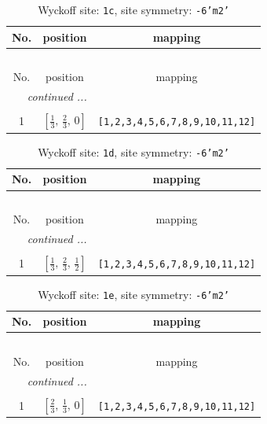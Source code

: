 \documentclass[fleqn,8pt]{jsarticle}
\begin{document}
\begin{longtable}{ccc}
\caption{Wyckoff site: {\tt 1c}, site symmetry: {\tt -6'm2'}}
 \\
 \hline \hline
No. & position & mapping \\ \hline \endfirsthead

\multicolumn{2}{l}{\tablename\ \thetable{}} \\
 \hline \hline
No. & position & mapping \\ \hline \endhead

 \hline \hline
\multicolumn{2}{r}{\footnotesize\it continued ...} \\ \endfoot

 \hline \hline
\multicolumn{2}{r}{} \\ \endlastfoot

1 & $\left[ \frac{1}{3},\, \frac{2}{3},\, 0 \right]$ & {\tt [1,2,3,4,5,6,7,8,9,10,11,12]} \\
\end{longtable}
\renewcommand{\arraystretch}{1.2}
\begin{longtable}{ccc}
\caption{Wyckoff site: {\tt 1d}, site symmetry: {\tt -6'm2'}}
 \\
 \hline \hline
No. & position & mapping \\ \hline \endfirsthead

\multicolumn{2}{l}{\tablename\ \thetable{}} \\
 \hline \hline
No. & position & mapping \\ \hline \endhead

 \hline \hline
\multicolumn{2}{r}{\footnotesize\it continued ...} \\ \endfoot

 \hline \hline
\multicolumn{2}{r}{} \\ \endlastfoot

1 & $\left[ \frac{1}{3},\, \frac{2}{3},\, \frac{1}{2} \right]$ & {\tt [1,2,3,4,5,6,7,8,9,10,11,12]} \\
\end{longtable}
\renewcommand{\arraystretch}{1.2}
\begin{longtable}{ccc}
\caption{Wyckoff site: {\tt 1e}, site symmetry: {\tt -6'm2'}}
 \\
 \hline \hline
No. & position & mapping \\ \hline \endfirsthead

\multicolumn{2}{l}{\tablename\ \thetable{}} \\
 \hline \hline
No. & position & mapping \\ \hline \endhead

 \hline \hline
\multicolumn{2}{r}{\footnotesize\it continued ...} \\ \endfoot

 \hline \hline
\multicolumn{2}{r}{} \\ \endlastfoot

1 & $\left[ \frac{2}{3},\, \frac{1}{3},\, 0 \right]$ & {\tt [1,2,3,4,5,6,7,8,9,10,11,12]} \\
\end{longtable}
\end{document}
